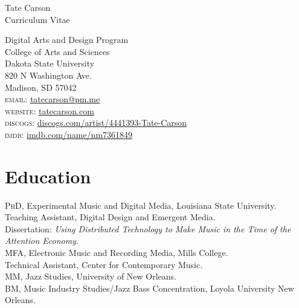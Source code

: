 \documentclass[12pt, a4paper]{article}
\newcommand{\years}[1]{\leavevmode\marginnote{\scriptsize #1}\ignorespaces}%
\begin{document}
\begin{center}
{\Huge Tate Carson}\\[0.1cm]
Curriculum Vitae
\vspace{0.5cm}
\end{center}

Digital Arts and Design Program \\
College of Arts and Sciences\\
Dakota State University \\ 
820 N Washington Ave.\\
Madison, SD 57042 \\[.2cm]

\textsc{email}: \href{mailto:tatecarson@pm.me}{tatecarson@pm.me}\\
\textsc{website}: \href{https://tatecarson.com}{tatecarson.com} \\
\textsc{discogs}: \href{https://www.discogs.com/artist/4441393-Tate-Carson}{discogs.com/artist/4441393-Tate-Carson} \\
\textsc{imdb}: \href{https://www.imdb.com/name/nm7361849/}{imdb.com/name/nm7361849}


\section*{Education}
\noindent
\years{2021}\textsc{PhD}, Experimental Music and Digital Media, Louisiana State University.\\
Teaching Assistant, Digital Design and Emergent Media. \\
Dissertation: \emph{Using Distributed Technology to Make Music in the Time of the Attention Economy}.\\
\years{2017}\textsc{MFA}, Electronic Music and Recording Media, Mills College.\\
Technical Assistant, Center for Contemporary Music.\\
\years{2011}\textsc{MM}, Jazz Studies, University of New Orleans.\\
\years{2009}\textsc{BM}, Music Industry Studies/Jazz Bass Concentration, Loyola University New Orleans.
\end{document}
